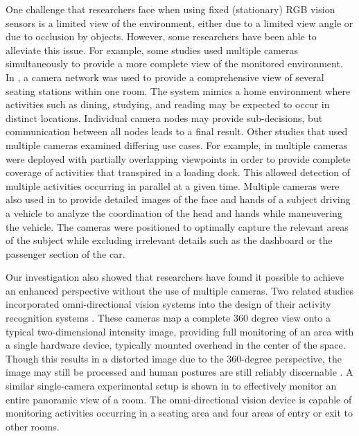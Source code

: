 \documentclass[12pt]{report}
\begin{document}
One challenge that researchers face when using fixed (stationary) RGB vision sensors is a limited view of the environment, either due to a limited view angle or due to occlusion by objects. However, some researchers have been able to alleviate this issue. For example, some studies used multiple cameras simultaneously to provide a more complete view of the monitored environment. In \cite{McIlwraith2009}, a camera network was used to provide a comprehensive view of several seating stations within one room. The system mimics a home environment where activities such as dining, studying, and reading may be expected to occur in distinct locations. Individual camera nodes may provide sub-decisions, but communication between all nodes leads to a final result. Other studies that used multiple cameras examined differing use cases. For example, in \cite{Hamid2005} multiple cameras were deployed with partially overlapping viewpoints in order to provide complete coverage of activities that transpired in a loading dock. This allowed detection of multiple activities occurring in parallel at a given time.  Multiple cameras were also used in \cite{Martin2017} to provide detailed images of the face and hands of a subject driving a vehicle to analyze the coordination of the head and hands while maneuvering the vehicle. The cameras were positioned to optimally capture the relevant areas of the subject while excluding irrelevant details such as the dashboard or the passenger section of the car.

Our investigation also showed that researchers have found it possible to achieve an enhanced perspective without the use of multiple cameras. Two related studies incorporated omni-directional vision systems into the design of their activity recognition systems \cite{Seki2009, Yiping2006}. These cameras map a complete 360 degree view onto a typical two-dimensional intensity image, providing full monitoring of an area with a single hardware device, typically mounted overhead in the center of the space. Though this results in a distorted image due to the 360-degree perspective, the image may still be processed and human postures are still reliably discernable \cite{Seki2009}. A similar single-camera experimental setup is shown in \cite{Yiping2006} to effectively monitor an entire panoramic view of a room. The omni-directional vision device is capable of monitoring activities occurring in a seating area and four areas of entry or exit to other rooms.
\end{document}
